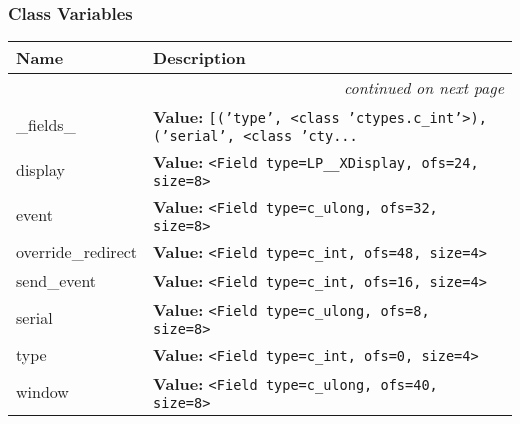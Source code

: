 
  \subsubsection{Class Variables}

    \vspace{-1cm}
\hspace{\varindent}\begin{longtable}{|p{\varnamewidth}|p{\vardescrwidth}|l}
\cline{1-2}
\cline{1-2} \centering \textbf{Name} & \centering \textbf{Description}& \\
\cline{1-2}
\endhead\cline{1-2}\multicolumn{3}{r}{\small\textit{continued on next page}}\\\endfoot\cline{1-2}
\endlastfoot\raggedright \_\-f\-i\-e\-l\-d\-s\-\_\- & \raggedright \textbf{Value:} 
{\tt \texttt{[}\texttt{(}\texttt{'}\texttt{type}\texttt{'}\texttt{, }{\textless}class 'ctypes.c\_int'{\textgreater}\texttt{)}\texttt{, }\texttt{(}\texttt{'}\texttt{serial}\texttt{'}\texttt{, }{\textless}class 'cty\texttt{...}}&\\
\cline{1-2}
\raggedright d\-i\-s\-p\-l\-a\-y\- & \raggedright \textbf{Value:} 
{\tt {\textless}Field type=LP\_\_XDisplay, ofs=24, size=8{\textgreater}}&\\
\cline{1-2}
\raggedright e\-v\-e\-n\-t\- & \raggedright \textbf{Value:} 
{\tt {\textless}Field type=c\_ulong, ofs=32, size=8{\textgreater}}&\\
\cline{1-2}
\raggedright o\-v\-e\-r\-r\-i\-d\-e\-\_\-r\-e\-d\-i\-r\-e\-c\-t\- & \raggedright \textbf{Value:} 
{\tt {\textless}Field type=c\_int, ofs=48, size=4{\textgreater}}&\\
\cline{1-2}
\raggedright s\-e\-n\-d\-\_\-e\-v\-e\-n\-t\- & \raggedright \textbf{Value:} 
{\tt {\textless}Field type=c\_int, ofs=16, size=4{\textgreater}}&\\
\cline{1-2}
\raggedright s\-e\-r\-i\-a\-l\- & \raggedright \textbf{Value:} 
{\tt {\textless}Field type=c\_ulong, ofs=8, size=8{\textgreater}}&\\
\cline{1-2}
\raggedright t\-y\-p\-e\- & \raggedright \textbf{Value:} 
{\tt {\textless}Field type=c\_int, ofs=0, size=4{\textgreater}}&\\
\cline{1-2}
\raggedright w\-i\-n\-d\-o\-w\- & \raggedright \textbf{Value:} 
{\tt {\textless}Field type=c\_ulong, ofs=40, size=8{\textgreater}}&\\
\cline{1-2}
\end{longtable}

